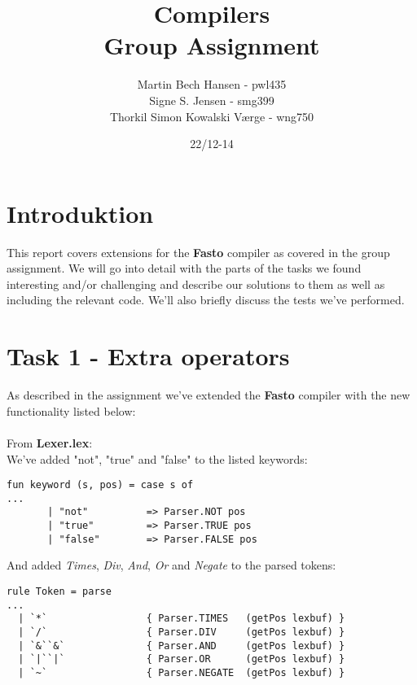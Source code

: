 \documentclass{article}
\begin{document}

\title{Compilers\\Group Assignment}
\author{Martin Bech Hansen - pwl435\\Signe S. Jensen - smg399\\Thorkil Simon Kowalski Værge - wng750}

\date{22/12-14}

\maketitle
\newpage

\tableofcontents

\newpage

\section{Introduktion}
This report covers extensions for the \textbf{Fasto} compiler as covered in the group assignment. We will go into detail with the parts of the tasks we found interesting and/or challenging and describe our solutions to them as well as including the relevant code. We'll also briefly discuss the tests we've performed.

\section{Task 1 - Extra operators}

As described in the assignment we've extended the \textbf{Fasto} compiler with the new functionality listed below:\\
\\
From \textbf{Lexer.lex}:\\
We've added "not", "true" and "false" to the listed keywords:
\begin{lstlisting}
fun keyword (s, pos) = case s of
...
       | "not"          => Parser.NOT pos
       | "true"         => Parser.TRUE pos
       | "false"        => Parser.FALSE pos       
\end{lstlisting}
\noindent And added \textit{Times}, \textit{Div}, \textit{And}, \textit{Or} and \textit{Negate} to the parsed tokens:
\begin{lstlisting}
rule Token = parse
...
  | `*`                 { Parser.TIMES   (getPos lexbuf) }
  | `/`                 { Parser.DIV     (getPos lexbuf) }
  | `&``&`              { Parser.AND     (getPos lexbuf) }
  | `|``|`              { Parser.OR      (getPos lexbuf) }
  | `~`                 { Parser.NEGATE  (getPos lexbuf) }
\end{lstlisting}
\end{document}
